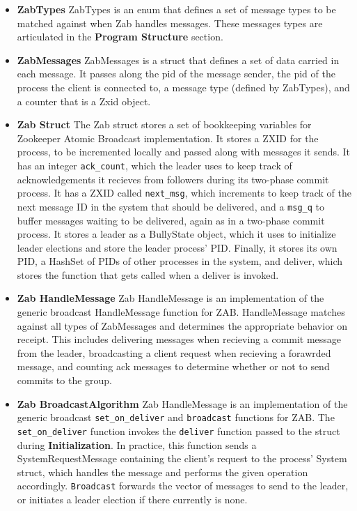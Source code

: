 \documentclass{article}
\begin{document}
	\begin{itemize}
	    \item\textbf{ZabTypes}
	    ZabTypes is an enum that defines a set of message types to be matched against when Zab handles messages. These messages types are articulated in the \textbf{Program Structure} section. 
	    \item\textbf{ZabMessages}
	    ZabMessages is a struct that defines a set of data carried in each message. It passes along the pid of the message sender, the pid of the process the client is connected to, a message type (defined by ZabTypes), and a counter that is a Zxid object. 
	    \item\textbf{Zab Struct}
	    The Zab struct stores a set of bookkeeping variables for Zookeeper Atomic Broadcast implementation. It stores a ZXID for the process, to be incremented locally and passed along with messages it sends. It has an integer \verb|ack_count|, which the leader uses to keep track of acknowledgements it recieves from followers during its two-phase commit process. It has a ZXID called \verb|next_msg|, which increments to keep track of the next message ID in the system that should be delivered, and a \verb|msg_q| to buffer messages waiting to be delivered, again as in a two-phase commit process. It stores a leader as a BullyState object, which it uses to initialize leader elections and store the leader process' PID. Finally, it stores its own PID, a HashSet of PIDs of other processes in the system, and deliver, which stores the function that gets called when a deliver is invoked. 
	    \item\textbf{Zab HandleMessage}
	    Zab HandleMessage is an implementation of the generic broadcast HandleMessage function for ZAB. HandleMessage matches against all types of ZabMessages and determines the appropriate behavior on receipt. This includes delivering messages when recieving a commit message from the leader, broadcasting a client request when recieving a forawrded message, and counting ack messages to determine whether or not to send commits to the group.
   	    \item\textbf{Zab BroadcastAlgorithm}
   	   	Zab HandleMessage is an implementation of the generic broadcast \verb|set_on_deliver| and \verb|broadcast| functions for ZAB. The \verb|set_on_deliver| function invokes the \verb|deliver| function passed to the struct during \textbf{Initialization}. In practice, this function sends a SystemRequestMessage containing the client's request to the process' System struct, which handles the message and performs the given operation accordingly. \verb|Broadcast| forwards the vector of messages to send to the leader, or initiates a leader election if there currently is none. 
	\end{itemize}
\end{document}

